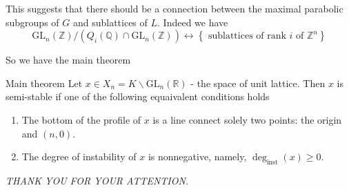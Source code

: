 \documentclass[pdf]{beamer}
\begin{document}
\begin{frame}
    This suggests that there should be a connection between the maximal parabolic subgroups of $G$
    and sublattices of $L$. Indeed we have
    \[ \text{GL}_n(\mathbb{Z})/(Q_i(\mathbb{Q}) \cap \text{GL}_n(\mathbb{Z})) \longleftrightarrow \left\lbrace \text{ sublattices of rank $i$ of $\mathbb{Z}^n$}\right\rbrace\]

    So we have the main theorem
    \begin{block}{Main theorem}
        Let $x \in X_n = K \backslash \text{GL}_n(\mathbb{R})$ - the space of unit lattice. Then $x$ is semi-stable if one of the following equaivalent
        conditions holds
        \begin{enumerate}
            \item The bottom of the profile of $x$ is a line connect solely two points: the origin and $(n,0)$.
            \item The degree of instability of $x$ is nonnegative, namely, $\deg_{\text{inst}}(x) \ge 0$.
        \end{enumerate}
    \end{block}

\end{frame}


\begin{frame}
    \begin{center}
        \textit{THANK YOU FOR YOUR ATTENTION.}
    \end{center}
\end{frame}
\end{document}
